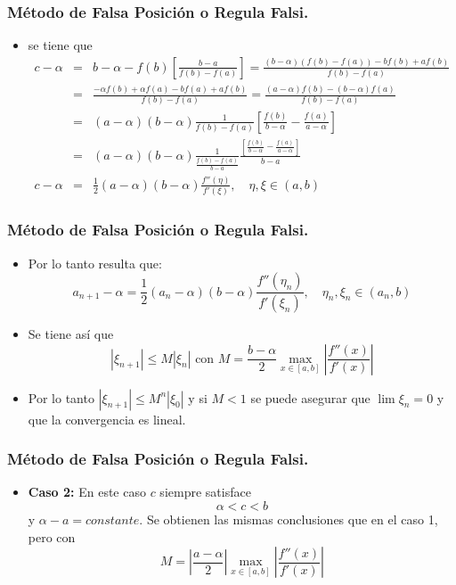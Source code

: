 \documentclass{beamer}
\begin{document}
\begin{frame}
   \frametitle{M\'etodo de Falsa Posici\'on o Regula Falsi.}
   \begin{itemize}
     \item<1->se tiene que 
     \scriptsize{
     \begin{eqnarray}
      \nonumber c - \alpha & = &  b - \alpha - f(b)\left[\frac{b-a}{f(b)-f(a)}\right] =
     \frac{(b-\alpha)(f(b)-f(a))-bf(b)+af(b)}{f(b)-f(a)}\\
     \nonumber & = & \frac{-\alpha f(b)+\alpha f(a)-bf(a)+af(b)}{f(b)-f(a)} =
     \frac{(a-\alpha)f(b)-(b-\alpha)f(a)}{f(b)-f(a)}\\
     \nonumber & = & (a-\alpha)(b-\alpha)\frac{1}{f(b)-f(a)}\left[\frac{f(b)}{b-\alpha}-\frac{f(a)}{a-\alpha}\right]\\
     \nonumber & = &
     \displaystyle(a-\alpha)(b-\alpha)\frac{1}{\displaystyle\frac{f(b)-f(a)}{b-a}}\frac{\left[\displaystyle\frac{f(b)}{
     b-\alpha} -\frac { f(a)}{ a-\alpha } \right]}{ b-a } \\
     \nonumber c - \alpha & = & \frac{1}{2}(a-\alpha)(b-\alpha)\frac{f''(\eta)}{f'(\xi)}, \quad \eta,\xi \in (a,b) 
     \end{eqnarray}
     }
    \end{itemize}
 \end{frame}
 \begin{frame}
    \frametitle{M\'etodo de Falsa Posici\'on o Regula Falsi.}
 \begin{itemize}
  \item<1-> Por lo tanto resulta que:    
     $$
     a_{n+1}-\alpha = \frac{1}{2}(a_n-\alpha)(b-\alpha)\frac{f''(\eta_n)}{f'(\xi_n)}, \quad \eta_n,\xi_n \in (a_n,b)
     $$    
  \item<2-> Se tiene as\'i que    
     $$
     |\xi_{n+1}| \leq M|\xi_n| \mbox{ con } M = \frac{b-\alpha}{2}\max_{x \in [a,b]}\left|\frac{f''(x)}{f'(x)}\right|
     $$
  \item<3-> Por lo tanto $|\xi_{n+1}| \leq M^n|\xi_0|$ y si $M<1$ se puede asegurar que $\lim \xi_n = 0$ y que la convergencia es
     lineal.
    \end{itemize}
 \end{frame}
 \begin{frame}
    \frametitle{M\'etodo de Falsa Posici\'on o Regula Falsi.}
    \begin{itemize}
      \item<1->\textbf{Caso 2:} En este caso $c$ siempre satisface
           $$
           \alpha < c < b
           $$
           y $\alpha -a=constante$. Se obtienen las mismas conclusiones que en el caso 1, pero con
           $$
           M = \left|\frac{a-\alpha}{2}\right|\max_{x \in [a,b]}\left|\frac{f''(x)}{f'(x)}\right|
           $$
    \end{itemize}
 \end{frame}
\end{document}
